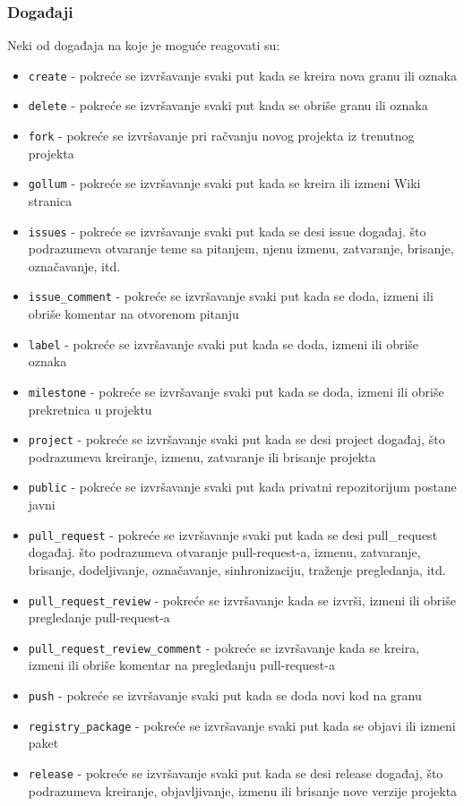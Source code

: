 \documentclass[12pt]{report}
\begin{document}
\subsubsection{Događaji}
Neki od događaja na koje je moguće reagovati su:

\begin{itemize}
    \item \texttt{create} - pokreće se izvršavanje svaki put kada se kreira nova granu ili oznaka
    \item \texttt{delete} - pokreće se izvršavanje svaki put kada se obriše granu ili oznaka
    \item \texttt{fork} - pokreće se izvršavanje pri račvanju novog projekta iz trenutnog projekta
    \item \texttt{gollum} - pokreće se izvršavanje svaki put kada se kreira ili izmeni Wiki stranica
    \item \texttt{issues} - pokreće se izvršavanje svaki put kada se desi issue događaj. što podrazumeva otvaranje teme sa pitanjem, njenu izmenu, zatvaranje, brisanje, označavanje, itd.
    \item \texttt{issue\_comment} - pokreće se izvršavanje svaki put kada se doda, izmeni ili obriše komentar na otvorenom pitanju
    \item \texttt{label} - pokreće se izvršavanje svaki put kada se doda, izmeni ili obriše oznaka
    \item \texttt{milestone} - pokreće se izvršavanje svaki put kada se doda, izmeni ili obriše prekretnica u projektu
    \item \texttt{project} - pokreće se izvršavanje svaki put kada se desi project događaj, što podrazumeva kreiranje, izmenu, zatvaranje ili brisanje projekta
    \item \texttt{public} - pokreće se izvršavanje svaki put kada privatni repozitorijum postane javni
    \item \texttt{pull\_request} - pokreće se izvršavanje svaki put kada se desi pull\_request događaj. što podrazumeva otvaranje pull-request-a, izmenu, zatvaranje, brisanje, dodeljivanje, označavanje, sinhronizaciju, traženje pregledanja, itd.
    \item \texttt{pull\_request\_review} - pokreće se izvršavanje kada se izvrši, izmeni ili obriše pregledanje pull-request-a
    \item \texttt{pull\_request\_review\_comment} - pokreće se izvršavanje kada se kreira, izmeni ili obriše komentar na pregledanju pull-request-a
    \item \texttt{push} - pokreće se izvršavanje svaki put kada se doda novi kod na granu
    \item \texttt{registry\_package} - pokreće se izvršavanje svaki put kada se objavi ili izmeni paket
    \item \texttt{release} - pokreće se izvršavanje svaki put kada se desi release događaj, što podrazumeva kreiranje, objavljivanje, izmenu ili brisanje nove verzije projekta
\end{itemize}
\end{document}
